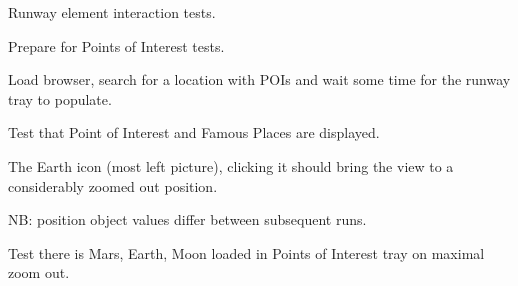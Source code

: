 \documentclass[letterpaper,10pt,english]{sphinxmanual}
\begin{document}
\begin{fulllineitems}
\label{test_runway:test_runway.TestRunway}
Runway element interaction tests.

\begin{fulllineitems}
\label{test_runway:test_runway.TestRunway.prepare_poi}
Prepare for Points of Interest tests.

Load browser, search for a location with POIs and wait
some time for the runway tray to populate.

\end{fulllineitems}


\begin{fulllineitems}
\label{test_runway:test_runway.TestRunway.test_runway_buttons_basic}
Test that Point of Interest and Famous Places are displayed.

\end{fulllineitems}


\begin{fulllineitems}
\label{test_runway:test_runway.TestRunway.test_runway_check_earth_icon_click}
The Earth icon (most left picture), clicking it should bring the
view to a considerably zoomed out position.

NB: position object values differ between subsequent runs.

\end{fulllineitems}


\begin{fulllineitems}
\label{test_runway:test_runway.TestRunway.test_runway_planets_on_max_zoom_out}
Test there is Mars, Earth, Moon loaded
in Points of Interest tray on maximal zoom out.


\end{fulllineitems}
\end{fulllineitems}
\end{document}

